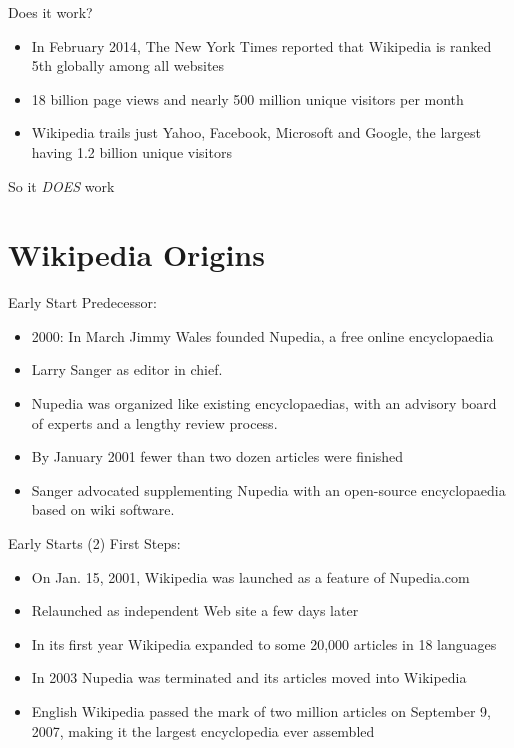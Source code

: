 \documentclass{beamer}
\begin{document}
\begin{frame}{Does it work?}
	\begin{itemize}
		\pause \item In February 2014, The New York Times reported that Wikipedia is ranked 5th globally among all websites
		\pause \item 18 billion page views and nearly 500 million unique visitors per month
		\pause \item Wikipedia trails just Yahoo, Facebook, Microsoft and Google, the largest having 1.2 billion unique visitors
	\end{itemize}
	\pause
	So it \emph{DOES} work
\end{frame}

\section{Wikipedia Origins}
\begin{frame} {Early Start}
	Predecessor:
	\begin{itemize}
		\pause \item 2000: In March Jimmy Wales founded Nupedia, a free online encyclopaedia
		\pause \item Larry Sanger as editor in chief.
		\pause \item Nupedia was organized like existing encyclopaedias, with an advisory board of experts and a lengthy review process.
		\pause \item By January 2001 fewer than two dozen articles were finished
		\pause \item Sanger advocated supplementing Nupedia with an open-source encyclopaedia based on wiki software.
	\end{itemize}
\end{frame}

\begin{frame} {Early Starts (2)}
	First Steps:
	\begin{itemize}
		\pause \item On Jan. 15, 2001, Wikipedia was launched as a feature of Nupedia.com
		\pause \item Relaunched as independent Web site a few days later
		\pause \item In its first year Wikipedia expanded to some 20,000 articles in 18 languages
		\pause \item In 2003 Nupedia was terminated and its articles moved into Wikipedia
		\pause \item English Wikipedia passed the mark of two million articles on September 9, 2007, making it the
			largest encyclopedia ever assembled
	\end{itemize}
\end{frame}
\end{document}
